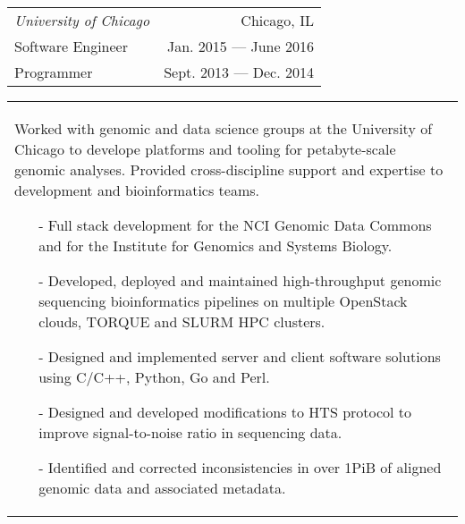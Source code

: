 \begin{tabularx}{\textwidth}{L R}
    \normalsize\textit{University of Chicago} & Chicago, IL \\
    Software Engineer & Jan. 2015 --- June 2016 \\
    Programmer & Sept. 2013 --- Dec. 2014 \\
\end{tabularx}
\begin{tabularx}{\textwidth}{X}
    \vspace{1pt}
    Worked with genomic and data science groups at the University of Chicago to develope platforms and tooling for petabyte-scale genomic analyses. Provided cross-discipline support and expertise to development and bioinformatics teams.
    \begin{itemize}
        \itemsep{}
        \item[-] Full stack development for the NCI Genomic Data Commons and for the Institute for Genomics and Systems Biology.
        \item[-] Developed, deployed and maintained high-throughput genomic sequencing bioinformatics pipelines on multiple OpenStack clouds, TORQUE and SLURM HPC clusters.
        \item[-] Designed and implemented server and client software solutions using C/C++, Python, Go and Perl.
        \item[-] Designed and developed modifications to HTS protocol to improve signal-to-noise ratio in sequencing data.
        \item[-] Identified and corrected inconsistencies in over 1PiB of aligned genomic data and associated metadata.
    \end{itemize}
\end{tabularx}

